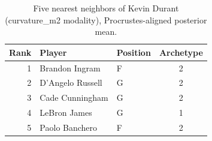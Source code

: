 \begin{table}[htbp]
  \centering\small
  \begin{tabular}{rllc}
    \toprule
    Rank & Player & Position & Archetype \\
    \midrule
    1 & Brandon Ingram & F & 2 \\
    2 & D'Angelo Russell & G & 2 \\
    3 & Cade Cunningham & G & 2 \\
    4 & LeBron James & G & 1 \\
    5 & Paolo Banchero & F & 2 \\
    \bottomrule
  \end{tabular}
  \caption{Five nearest neighbors of Kevin Durant (curvature_m2 modality), Procrustes-aligned posterior mean.}
  \label{tab:Kevin_Durant_neighbors_curvature_m2}
\end{table}

